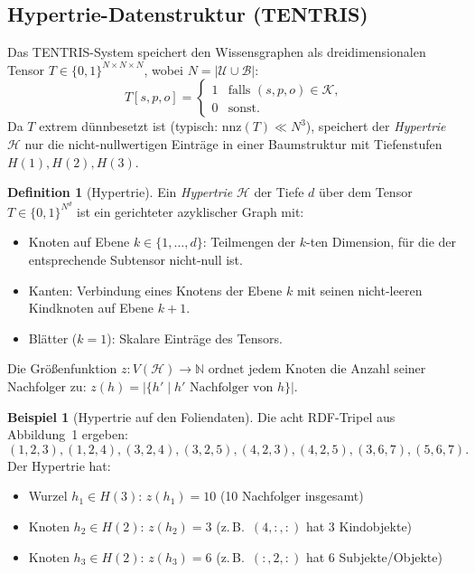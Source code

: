 ﻿\documentclass[a4paper,12pt]{article}
\theoremstyle{definition}
\newtheorem{definition}{Definition}
\newtheorem{beispiel}{Beispiel}
\begin{document}
\subsection{Hypertrie-Datenstruktur (TENTRIS)}

Das TENTRIS-System speichert den Wissensgraphen als dreidimensionalen Tensor
$T \in \{0,1\}^{N \times N \times N}$, wobei $N = |\mathcal{U} \cup \mathcal{B}|$:
\[
  T[s,p,o] = \begin{cases} 1 & \text{falls } (s,p,o) \in \mathcal{K}, \\ 0 & \text{sonst}.\end{cases}
\]
Da $T$ extrem dünnbesetzt ist (typisch: $\mathrm{nnz}(T) \ll N^3$), speichert der
\emph{Hypertrie} $\mathcal{H}$ nur die nicht-nullwertigen Einträge in einer
Baumstruktur mit Tiefenstufen $H(1), H(2), H(3)$.

\begin{definition}[Hypertrie]
\label{def:hypertrie}
Ein \emph{Hypertrie} $\mathcal{H}$ der Tiefe $d$ über dem Tensor $T \in \{0,1\}^{N^d}$
ist ein gerichteter azyklischer Graph mit:
\begin{itemize}
  \item Knoten auf Ebene $k \in \{1, \ldots, d\}$: Teilmengen der $k$-ten Dimension,
        für die der entsprechende Subtensor nicht-null ist.
  \item Kanten: Verbindung eines Knotens der Ebene $k$ mit seinen nicht-leeren
        Kindknoten auf Ebene $k+1$.
  \item Blätter ($k=1$): Skalare Einträge des Tensors.
\end{itemize}
Die Größenfunktion $z: V(\mathcal{H}) \to \mathbb{N}$ ordnet jedem Knoten die Anzahl
seiner Nachfolger zu: $z(h) = |\{h' \mid h' \text{ Nachfolger von } h\}|$.
\end{definition}

\begin{beispiel}[Hypertrie auf den Foliendaten]
Die acht RDF-Tripel aus Abbildung~1 ergeben:
\[
  (1,2,3),(1,2,4),(3,2,4),(3,2,5),(4,2,3),(4,2,5),(3,6,7),(5,6,7).
\]
Der Hypertrie hat:
\begin{itemize}
  \item Wurzel $h_1 \in H(3)$: $z(h_1) = 10$ (10 Nachfolger insgesamt)
  \item Knoten $h_2 \in H(2)$: $z(h_2) = 3$ (z.\,B.\ $(4,:,:)$ hat 3 Kindobjekte)
  \item Knoten $h_3 \in H(2)$: $z(h_3) = 6$ (z.\,B.\ $(:,2,:)$ hat 6 Subjekte/Objekte)
\end{itemize}
\end{beispiel}
\end{document}
